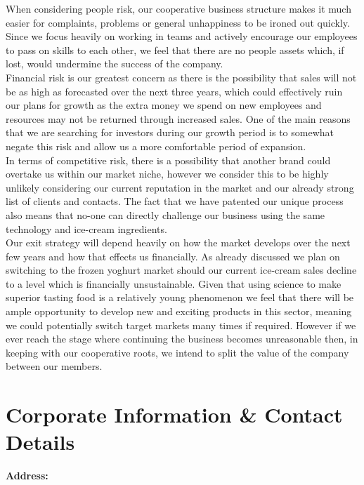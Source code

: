 \documentclass{article}
\begin{document}
When considering people risk, our cooperative business structure makes it much easier for complaints, problems or general unhappiness to be ironed out quickly. Since we focus heavily on working in teams and actively encourage our employees to pass on skills to each other, we feel that there are no people assets which, if lost, would undermine the success of the company. \\

Financial risk is our greatest concern as there is the possibility that sales will not be as high as forecasted over the next three years, which could effectively ruin our plans for growth as the extra money we spend on new employees and resources may not be returned through increased sales. One of the main reasons that we are searching for investors during our growth period is to somewhat negate this risk and allow us a more comfortable period of expansion. \\

In terms of competitive risk, there is a possibility that another brand could overtake us within our market niche, however we consider this to be highly unlikely considering our current reputation in the market and our already strong list of clients and contacts. The fact that we have patented our unique process also means that no-one can directly challenge our business using the same technology and ice-cream ingredients. \\

Our exit strategy will depend heavily on how the market develops over the next few years and how that effects us financially. As already discussed we plan on switching to the frozen yoghurt market should our current ice-cream sales decline to a level which is financially unsustainable. Given that using science to make superior tasting food is a relatively young phenomenon we feel that there will be ample opportunity to develop new and exciting products in this sector, meaning we could potentially switch target markets many times if required. However if we ever reach the stage where continuing the business becomes unreasonable then, in keeping with our cooperative roots, we intend to split the value of the company between our members.

\section{Corporate Information \& Contact Details}

{\bf Address:} \\
\end{document}
